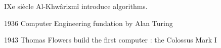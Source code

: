 \begin{frame}{IXe siècle}
    Al-Khwârizmî introduce algorithms.
\end{frame}

\begin{frame}{1936}
    Computer Engineering fundation by Alan Turing
\end{frame}

\begin{frame}{1943}
    Thomas Flowers build the first computer : the Colossus Mark I
\end{frame}

